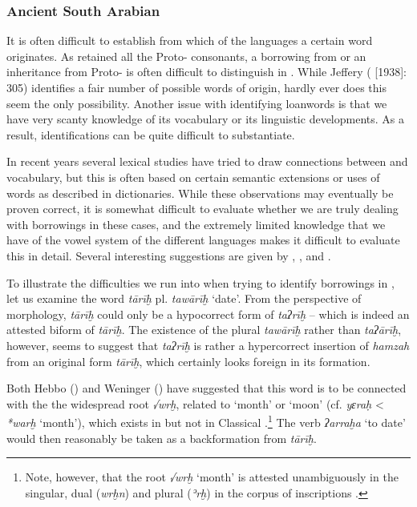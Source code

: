 \documentclass[output=paper]{langsci/langscibook}
\begin{document}
\subsubsection{\label{bkm:Ref13224682}Ancient South Arabian}

It is often difficult to establish from which of the  languages a certain word originates. As  retained all the Proto- consonants, a borrowing from  or an inheritance from Proto- is often difficult to distinguish in . While Jeffery (\citeyear{Jeffrey2007} [1938]: 305) identifies a fair number of possible words of  origin, hardly ever does this seem the only possibility. Another issue with identifying  {loanwords} is that we have very scanty knowledge of its vocabulary or its linguistic developments. As a result,  identifications can be quite difficult to substantiate.

In recent years several lexical studies have tried to draw connections between  and  vocabulary, but this is often based on certain semantic extensions or uses of words as described in  dictionaries. While these observations may eventually be proven correct, it is somewhat difficult to evaluate whether we are truly dealing with borrowings in these cases, and the extremely limited knowledge that we have of the vowel system of the different  languages makes it difficult to evaluate this in detail. Several interesting suggestions are given by  \cite{Weninger2009},  \cite{Hayajneh2011},  \cite{Elmaz2014} and  \cite{Elmaz2016}. 

To illustrate the difficulties we run into when trying to identify  borrowings in , let us examine the word \textit{tārīḫ} pl. \textit{tawārīḫ} ‘date’. From the perspective of  morphology, \textit{tārīḫ} could only be a hypocorrect form of \textit{taʔrīḫ} – which is indeed an attested biform of \textit{tārīḫ}. The existence of the plural \textit{tawārīḫ} rather than \textit{taʔārīḫ}, however, seems to suggest that \textit{taʔrīḫ} is rather a hypercorrect insertion of \textit{hamzah} from an original form \textit{tārīḫ}, which certainly looks foreign in its {formation}.

Both Hebbo (\citeyear[27]{Hebbo1984}) and Weninger (\citeyear[399]{Weninger2009}) have suggested that this word is to be connected with the the widespread  {root} \textit{√wrḫ}, related to ‘month’ or ‘moon’ (cf.  \textit{yɛraḥ} < \textit{*warḫ} ‘month’), which exists in  but not in Classical .\footnote{Note, however, that the {root} \textit{√wrḫ} ‘month’ is attested unambiguously in the singular, dual (\textit{wrḫn}) and plural (\textit{ʾrḫ}) in the   corpus of  inscriptions \citep[353]{Al-Jallad2015Safaitic}.} The verb \textit{ʔarraḫa} ‘to date’ would then reasonably be taken as a backformation from \textit{tārīḫ}.
\end{document}

